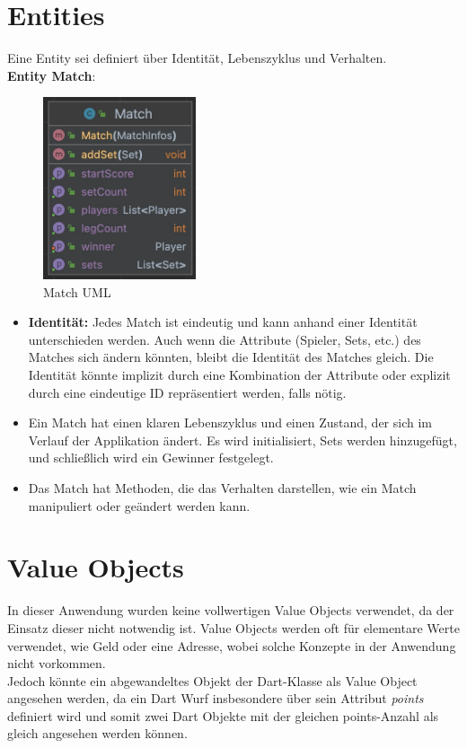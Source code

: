 \section{Entities}
Eine Entity sei definiert über Identität, Lebenszyklus und Verhalten.\\
\textbf{Entity Match}:\\
\begin{figure}[ht]
    \centering
    \includegraphics[width=0.4\textwidth]{Bilder/match.png}
    \caption{Match UML}
    \label{fig:match-uml}
\end{figure}
\begin{itemize}
    \item \textbf{Identität:} Jedes Match ist eindeutig und kann anhand einer Identität unterschieden werden. Auch wenn die Attribute (Spieler, Sets, etc.) des Matches sich ändern könnten, bleibt die Identität des Matches gleich. Die Identität könnte implizit durch eine Kombination der Attribute oder explizit durch eine eindeutige ID repräsentiert werden, falls nötig.
    \item Ein Match hat einen klaren Lebenszyklus und einen Zustand, der sich im Verlauf der Applikation ändert. Es wird initialisiert, Sets werden hinzugefügt, und schließlich wird ein Gewinner festgelegt.
    \item Das Match hat Methoden, die das Verhalten darstellen, wie ein Match manipuliert oder geändert werden kann.
\end{itemize}
\section{Value Objects}
In dieser Anwendung wurden keine vollwertigen Value Objects verwendet, da der Einsatz dieser nicht notwendig ist. Value Objects werden oft für elementare Werte verwendet, wie Geld oder eine Adresse, wobei solche Konzepte in der Anwendung nicht vorkommen.\\
Jedoch könnte ein abgewandeltes Objekt der Dart-Klasse als Value Object angesehen werden, da ein Dart Wurf insbesondere über sein Attribut \textit{points} definiert wird und somit zwei Dart Objekte mit der gleichen points-Anzahl als gleich angesehen werden können.
